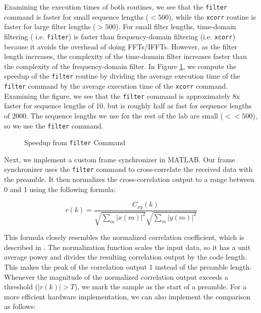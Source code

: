 \documentclass{article}
\begin{document}
\noindent Examining the execution times of both routines, we see that the \texttt{filter} command is faster for small sequence lengths ($< 500$), while the \texttt{xcorr} routine is faster for large filter lengths ($> 500$). For small filter lengths, time-domain filtering ( i.e. \texttt{filter}) is faster than frequency-domain filtering (i.e. \texttt{xcorr}) because it avoids the overhead of doing FFTs/IFFTs. However, as the filter length increases, the complexity of the time-domain filter increases faster than the complexity of the frequency-domain filter. In Figure \ref{fig::speedup}, we compute the speedup of the \texttt{filter} routine by dividing the average execution time of the \texttt{filter} command by the average execution time of the \texttt{xcorr} command. Examining the figure, we see that the \texttt{filter} command is approximately 8x faster for sequence lengths of 10, but is roughly half as fast for sequence lengths of 2000. The sequence lengths we use for the rest of the lab are small ($<< 500$), so we use the \texttt{filter} command.  

\begin{figure}[H]
	\centerline{}
	\caption{Speedup from \texttt{filter} Command}
	\label{fig::speedup}
\end{figure}

Next, we implement a custom frame synchronizer in MATLAB. Our frame synchronizer uses the \texttt{filter} command to cross-correlate the received data with the preamble. It then normalizes the cross-correlation output to a range between 0 and 1 using the following formula:

\begin{equation}
	r(k) = \frac{C_{xy}(k)}{\sqrt{\sum_m{|x(m)|^2}}\sqrt{\sum_m{|y(m)|^2}}}
\end{equation}

\noindent This formula closely resembles the normalized correlation coefficient, which is described in \cite{pearson_correlation_coefficient}. The normalization function scales the input data, so it has a unit average power and divides the resulting correlation output by the code length. This makes the peak of the correlation output 1 instead of the preamble length. Whenever the magnitude of the normalized correlation output exceeds a threshold ($|r(k)| > T$), we mark the sample as the start of a preamble. For a more efficient hardware implementation, we can also implement the comparison as follows:
\end{document}
